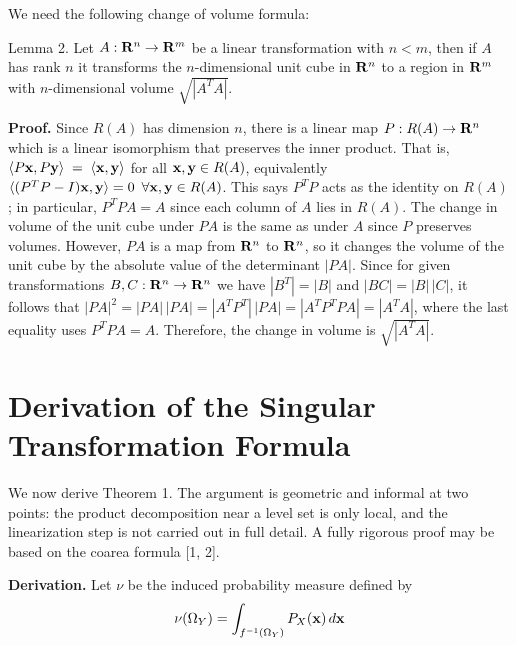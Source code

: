 \bigskip

We need the following change of volume formula:

\proclaim Lemma 2. Let 
$A : {\bf R}^n \to {\bf R}^m$ be a linear 
transformation with $n < m$, then if $A$ has rank $n$ it transforms the 
$n$-dimensional unit cube in ${\bf R}^n$ to a region in ${\bf R}^m$ with
$n$-dimensional volume
$\sqrt{ |A^T A|}$.

{\bf Proof.} Since $R(A)$ has dimension $n$, there is a linear map
$P: R(A) \to {\bf R}^n$ which is a linear isomorphism that preserves the
inner product. That is, $\langle P {\bf x}, P{\bf y}\rangle \; = \; \langle{\bf x}, {\bf y}\rangle$
for all ${\bf x}, {\bf y} \in R(A)$, equivalently
$\langle(P^TP - I){\bf x}, {\bf y}\rangle = 0 \enspace \forall {\bf x}, {\bf y} \in R(A)$.
This says $P^TP$ acts as the identity on $R(A)$; in particular,
$P^TP A = A$ since each column of $A$ lies in $R(A)$. The change in volume
of the unit cube under $PA$ is the same as under $A$ since $P$ preserves
volumes. However, $PA$ is a map from ${\bf R}^n$ to ${\bf R}^n$, so it changes
the volume of the unit cube by the absolute value of the determinant $|PA|$. Since for given transformations
$B, C: {\bf R}^n \to {\bf R}^n$ we have $|B^T| = |B|$ and $|BC| = |B|\,|C|$,
it follows that
$|PA|^2 = |PA|\,|PA| = |A^TP^T|\,|PA| = |A^TP^TPA| = |A^TA|$,
where the last equality uses $P^TPA = A$.
Therefore, the change in volume is $\sqrt{|A^TA|}$.

\bigskip

\section{Derivation of the Singular Transformation Formula}

We now derive Theorem 1. The argument is geometric and informal at two
points: the product decomposition near a level set is only local, and the
linearization step is not carried out in full detail. A fully rigorous proof
may be based on the coarea formula [1, 2].
\smallskip

{\bf Derivation.} Let $\nu$ be the induced probability measure defined by%
$$
\nu(\Omega_Y) = \int_{f^{-1}(\Omega_Y)} P_X({\bf x}) \, d{\bf x}
$$

